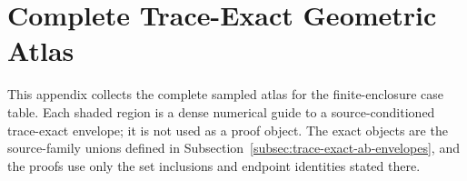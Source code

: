\section{Complete Trace-Exact Geometric Atlas}
\label{sec:trace-exact-geometric-atlas}

This appendix collects the complete sampled atlas for the finite-enclosure
case table.  Each shaded region is a dense numerical guide to a
source-conditioned trace-exact envelope; it is not used as a proof object.
The exact objects are the source-family unions defined in
Subsection~\ref{subsec:trace-exact-ab-envelopes}, and the proofs use only the
set inclusions and endpoint identities stated there.


